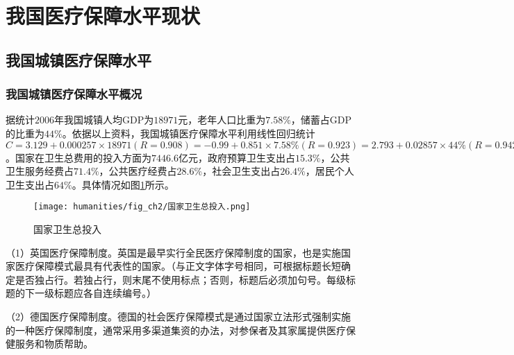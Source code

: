 
\section{我国医疗保障水平现状}

\subsection{我国城镇医疗保障水平}

\subsubsection{我国城镇医疗保障水平概况}

据统计$2006$年我国城镇人均GDP为$18971$元，老年人口比重为$7.58\%$，储蓄占GDP的比重为$44\%$。依据以上资料，我国城镇医疗保障水平利用线性回归统计$C=3.129+0.000257\times 18971(R=0.908)=-0.99+0.851\times 7.58\% (R=0.923)=2.793+0.02857\times 44\% (R=0.942)$。国家在卫生总费用的投入方面为$7446.6$亿元，政府预算卫生支出占$15.3\%$，公共卫生服务经费占$71.4\%$，公共医疗经费占$28.6\%$，社会卫生支出占$26.4\%$，居民个人卫生支出占$64\%$。具体情况如图\ref{fig:国家卫生总投入}所示。

\begin{figure}[H]
  \centering
  \texttt{[image: humanities/fig\_ch2/国家卫生总投入.png]}
  \caption{国家卫生总投入}
  \label{fig:国家卫生总投入}
\end{figure}

（1）英国医疗保障制度。英国是最早实行全民医疗保障制度的国家，也是实施国家医疗保障模式最具有代表性的国家。（与正文字体字号相同，可根据标题长短确定是否独占行。若独占行，则末尾不使用标点；否则，标题后必须加句号。每级标题的下一级标题应各自连续编号。）

（2）德国医疗保障制度。德国的社会医疗保障模式是通过国家立法形式强制实施的一种医疗保障制度，通常采用多渠道集资的办法，对参保者及其家属提供医疗保健服务和物质帮助。


